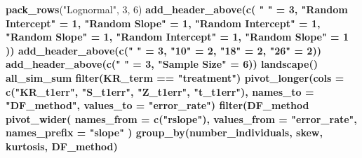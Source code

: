 \documentclass[12pt, twoside]{amherstthesis}
\newenvironment{Shaded}{\begin{snugshade}}{\end{snugshade}}
\newcommand{\DataTypeTok}[1]{\textcolor[rgb]{0.13,0.29,0.53}{#1}}
\newcommand{\DecValTok}[1]{\textcolor[rgb]{0.00,0.00,0.81}{#1}}
\newcommand{\KeywordTok}[1]{\textcolor[rgb]{0.13,0.29,0.53}{\textbf{#1}}}
\newcommand{\NormalTok}[1]{#1}
\newcommand{\OperatorTok}[1]{\textcolor[rgb]{0.81,0.36,0.00}{\textbf{#1}}}
\newcommand{\StringTok}[1]{\textcolor[rgb]{0.31,0.60,0.02}{#1}}
\begin{document}
\begin{Shaded}
\begin{Highlighting}[]
{{{{{{{{{{{{{{{{{{{{{{{{{{{{{{{{{{{{{{{{{{{{{\StringTok{  }\KeywordTok{pack_rows}\NormalTok{(}\StringTok{"Lognormal"}\NormalTok{, }\DecValTok{3}\NormalTok{, }\DecValTok{6}\NormalTok{) }\OperatorTok{%>%}
\StringTok{  }\KeywordTok{add_header_above}\NormalTok{(}\KeywordTok{c}\NormalTok{(}
    \StringTok{" "}\NormalTok{ =}\StringTok{ }\DecValTok{3}\NormalTok{, }\StringTok{"Random Intercept"}\NormalTok{ =}\StringTok{ }\DecValTok{1}\NormalTok{, }\StringTok{"Random Slope"}\NormalTok{ =}\StringTok{ }\DecValTok{1}\NormalTok{, }
    \StringTok{"Random Intercept"}\NormalTok{ =}\StringTok{ }\DecValTok{1}\NormalTok{,}
    \StringTok{"Random Slope"}\NormalTok{ =}\StringTok{ }\DecValTok{1}\NormalTok{, }\StringTok{"Random Intercept"}\NormalTok{ =}\StringTok{ }\DecValTok{1}\NormalTok{, }\StringTok{"Random Slope"}\NormalTok{ =}\StringTok{ }\DecValTok{1}
\NormalTok{  )) }\OperatorTok{%>%}
\StringTok{  }\KeywordTok{add_header_above}\NormalTok{(}\KeywordTok{c}\NormalTok{(}\StringTok{" "}\NormalTok{ =}\StringTok{ }\DecValTok{3}\NormalTok{, }\StringTok{"10"}\NormalTok{ =}\StringTok{ }\DecValTok{2}\NormalTok{, }\StringTok{"18"}\NormalTok{ =}\StringTok{ }\DecValTok{2}\NormalTok{, }\StringTok{"26"}\NormalTok{ =}\StringTok{ }\DecValTok{2}\NormalTok{)) }\OperatorTok{%>%}
\StringTok{  }\KeywordTok{add_header_above}\NormalTok{(}\KeywordTok{c}\NormalTok{(}\StringTok{" "}\NormalTok{ =}\StringTok{ }\DecValTok{3}\NormalTok{, }\StringTok{"Sample Size"}\NormalTok{ =}\StringTok{ }\DecValTok{6}\NormalTok{)) }\OperatorTok{%>%}
\StringTok{  }\KeywordTok{landscape}\NormalTok{()}
\NormalTok{all_sim_sum }\OperatorTok{%>%}
\StringTok{  }\KeywordTok{filter}\NormalTok{(KR_term }\OperatorTok{==}\StringTok{ "treatment"}\NormalTok{) }\OperatorTok{%>%}
\StringTok{  }\KeywordTok{pivot_longer}\NormalTok{(}\DataTypeTok{cols =} \KeywordTok{c}\NormalTok{(}\StringTok{"KR_t1err"}\NormalTok{, }\StringTok{"S_t1err"}\NormalTok{, }\StringTok{"Z_t1err"}\NormalTok{, }\StringTok{"t_t1err"}\NormalTok{), }
               \DataTypeTok{names_to =} \StringTok{"DF_method"}\NormalTok{, }\DataTypeTok{values_to =} \StringTok{"error_rate"}\NormalTok{) }\OperatorTok{%>%}
\StringTok{  }\KeywordTok{filter}\NormalTok{(DF_method }\OperatorTok{%in%}\StringTok{ }\KeywordTok{c}\NormalTok{(}\StringTok{"Z_t1err"}\NormalTok{, }\StringTok{"t_t1err"}\NormalTok{)) }\OperatorTok{%>%}
\StringTok{  }\KeywordTok{pivot_wider}\NormalTok{(}
    \DataTypeTok{names_from =} \KeywordTok{c}\NormalTok{(}\StringTok{"rslope"}\NormalTok{),}
    \DataTypeTok{values_from =} \StringTok{"error_rate"}\NormalTok{, }\DataTypeTok{names_prefix =} \StringTok{"slope"}
\NormalTok{  ) }\OperatorTok{%>%}
\StringTok{  }\KeywordTok{group_by}\NormalTok{(number_individuals, skew, kurtosis, DF_method) }\OperatorTok{%>%}
}}}}}}}}}}}}}}}}}}}}}}}}}}}}}}}}}}}}}}}}}}}}}}}}}}}}}}}
\end{Highlighting}
\end{Shaded}
\end{document}
